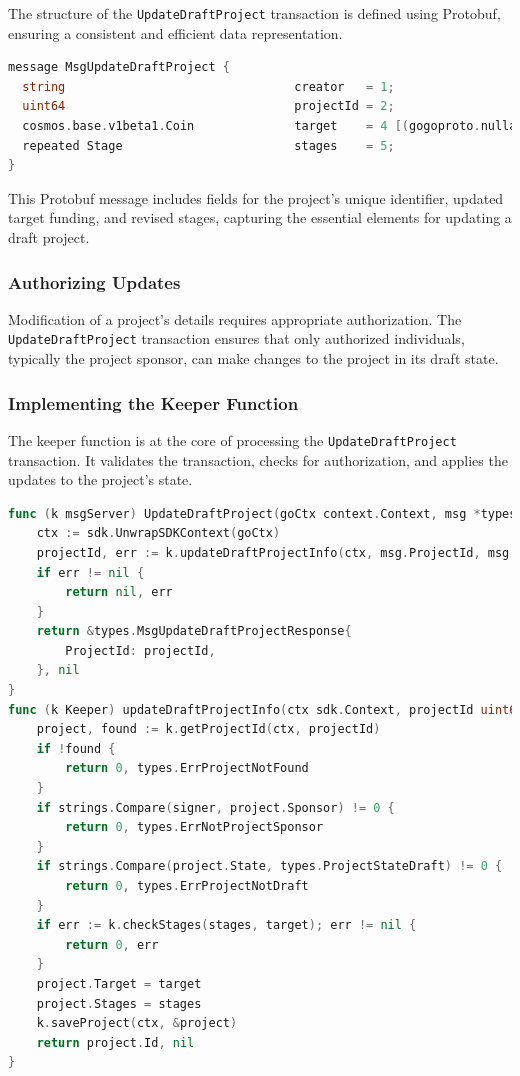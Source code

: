 The structure of the \texttt{UpdateDraftProject} transaction is defined using Protobuf, ensuring a consistent and efficient data representation.

\newpage
\begin{lstlisting}[language=go, caption=UpdateDraftProject protobuf definition, label={lst:update_draft_project_proto}]
message MsgUpdateDraftProject {
  string                                creator   = 1;
  uint64                                projectId = 2;
  cosmos.base.v1beta1.Coin              target    = 4 [(gogoproto.nullable) = false];
  repeated Stage                        stages    = 5;
}
\end{lstlisting}

This Protobuf message includes fields for the project's unique identifier, updated target funding, and revised stages, capturing the essential elements for updating a draft project.

\subsubsection{Authorizing Updates}
\label{subsubsec:authorizing-updates}

Modification of a project's details requires appropriate authorization. The \texttt{UpdateDraftProject} transaction ensures that only authorized individuals, typically the project sponsor, can make changes to the project in its draft state.

\subsubsection{Implementing the Keeper Function}
\label{subsubsec:keeper-update-draft}

The keeper function is at the core of processing the \texttt{UpdateDraftProject} transaction. It validates the transaction, checks for authorization, and applies the updates to the project's state.

\begin{lstlisting}[language=go, caption=Keeper implementation for UpdateDraftProject, label={lst:keeper-update-draft}]
func (k msgServer) UpdateDraftProject(goCtx context.Context, msg *types.MsgUpdateDraftProject) (*types.MsgUpdateDraftProjectResponse, error) {
	ctx := sdk.UnwrapSDKContext(goCtx)
	projectId, err := k.updateDraftProjectInfo(ctx, msg.ProjectId, msg.Target, msg.Stages, msg.Creator)
	if err != nil {
		return nil, err
	}
	return &types.MsgUpdateDraftProjectResponse{
		ProjectId: projectId,
	}, nil
}
func (k Keeper) updateDraftProjectInfo(ctx sdk.Context, projectId uint64, target sdk.Coin, stages []*types.Stage, signer string) (uint64, error) {
	project, found := k.getProjectId(ctx, projectId)
	if !found {
		return 0, types.ErrProjectNotFound
	}
	if strings.Compare(signer, project.Sponsor) != 0 {
		return 0, types.ErrNotProjectSponsor
	}
	if strings.Compare(project.State, types.ProjectStateDraft) != 0 {
		return 0, types.ErrProjectNotDraft
	}
	if err := k.checkStages(stages, target); err != nil {
		return 0, err
	}
	project.Target = target
	project.Stages = stages
	k.saveProject(ctx, &project)
	return project.Id, nil
}
\end{lstlisting}


